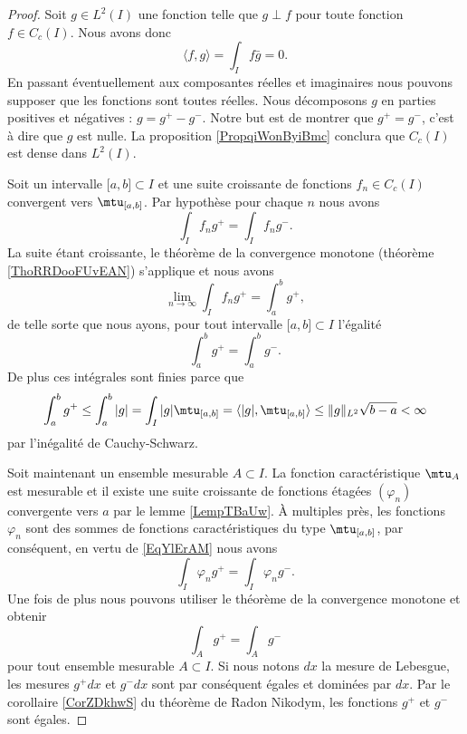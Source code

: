 \begin{proof}
    Soit \( g\in L^2(I)\) une fonction telle que \( g\perp f\) pour toute fonction \( f\in C_c(I)\). Nous avons donc
    \begin{equation}
        \langle f, g\rangle =\int_If\bar g=0.
    \end{equation}
    En passant éventuellement aux composantes réelles et imaginaires nous pouvons supposer que les fonctions sont toutes réelles. Nous décomposons \( g\) en parties positives et négatives : \( g=g^+-g^-\). Notre but est de montrer que \( g^+=g^-\), c'est à dire que \( g\) est nulle. La proposition \ref{PropqiWonByiBmc} conclura que \( C_c(I)\) est dense dans \( L^2(I)\).

    Soit un intervalle \( \mathopen[ a , b \mathclose]\subset I\) et une suite croissante de fonctions \( f_n\in C_c(I)\) convergent vers \( \mtu_{\mathopen[ a , b \mathclose]}\). Par hypothèse pour chaque \( n\) nous avons
    \begin{equation}
        \int_If_ng^+=\int_I f_ng^-.
    \end{equation}
    La suite étant croissante, le théorème de la convergence monotone (théorème \ref{ThoRRDooFUvEAN}) s'applique et nous avons
    \begin{equation}
        \lim_{n\to \infty} \int_I f_ng^+=\int_a^bg^+,
    \end{equation}
    de telle sorte que nous ayons, pour tout intervalle \( \mathopen[ a , b \mathclose]\subset I\) l'égalité
    \begin{equation}        \label{EqYlErAM}
        \int_a^bg^+=\int_a^bg^-.
    \end{equation}
    De plus ces intégrales sont finies parce que
    \begin{equation}
        \int_a^b g^+\leq\int_a^b| g |=\int_I| g |\mtu_{\mathopen[ a , b \mathclose]}=\langle | g |, \mtu_{\mathopen[ a , b \mathclose]}\rangle \leq \| g \|_{L^2}\sqrt{b-a}<\infty
    \end{equation}
    par l'inégalité de Cauchy-Schwarz.

    Soit maintenant un ensemble mesurable \( A\subset I\). La fonction caractéristique \( \mtu_A\) est mesurable et il existe une suite croissante de fonctions étagées \( (\varphi_n)\) convergente vers \( a\) par le lemme \ref{LempTBaUw}. À multiples près, les fonctions \( \varphi_n\) sont des sommes de fonctions caractéristiques du type \( \mtu_{\mathopen[ a , b \mathclose]}\), par conséquent, en vertu de \eqref{EqYlErAM} nous avons
    \begin{equation}
        \int_I\varphi_ng^+=\int_I\varphi_ng^-.
    \end{equation}
    Une fois de plus nous pouvons utiliser le théorème de la convergence monotone et obtenir
    \begin{equation}
        \int_Ag^+=\int_A g^-
    \end{equation}
    pour tout ensemble mesurable \( A\subset I\). Si nous notons \( dx\) la mesure de Lebesgue, les mesures \( g^+dx\) et \( g^-dx\) sont par conséquent égales et dominées par \( dx\). Par le corollaire \ref{CorZDkhwS} du théorème de Radon Nikodym, les fonctions \( g^+\) et \( g^-\) sont égales.
\end{proof}

